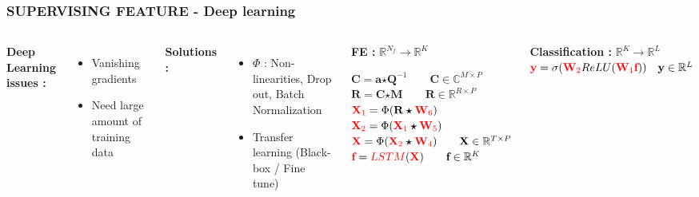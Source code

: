 \documentclass{beamer}
\begin{document}
\begin{frame}
\frametitle{SUPERVISING FEATURE - Deep learning}
\begin{columns}[c]
\textbf{Deep Learning issues :}
\begin{itemize}
\item Vanishing gradients
\item Need large amount of training data
\end{itemize}
\textbf{Solutions :}
\begin{itemize}
\item $\Phi$  : Non-linearities, Drop out, Batch Normalization
\item Transfer learning (Black-box / Fine tune)
\end{itemize}
\begin{block}{\textbf{FE :} $\mathbb{R}^{N_{f}} \rightarrow \mathbb{R}^{K}$}

$\textbf{C} = \textbf{a} \bm{\star} \textbf{Q}^{-1} \qquad \textbf{C} \in \mathbb{C}^{M \times P}$\\
$\textbf{R} = \textbf{C} \bm{\star} \textbf{M} \qquad \textbf{R} \in \mathbb{R}^{R \times P}$\\
${\color{red}\textbf{X}_{1}} = \Phi (\textbf{R} \bm{\star} {\color{red}\textbf{W}_{6}})$\\
${\color{red}\textbf{X}_{2}} = \Phi ({\color{red}\textbf{X}_{1}} \bm{\star} {\color{red}\textbf{W}_{5}})$\\
${\color{red}\textbf{X}} = \Phi ({\color{red}\textbf{X}_{2}} \bm{\star} {\color{red}\textbf{W}_{4}}) \qquad \textbf{X} \in \mathbb{R}^{T \times P}$\\
${\color{red}\textbf{f}} = {\color{red}LSTM}({\color{red}\textbf{X}}) \qquad \textbf{f} \in \mathbb{R}^{K}$\\
\end{block}

\begin{block}{\textbf{Classification :} $\mathbb{R}^{K} \rightarrow \mathbb{R}^{L}$}
${\color{red}\textbf{y}} = \sigma({\color{red}\textbf{W}_{2}}ReLU({\color{red}\textbf{W}_{1}}{\color{red}\textbf{f}})) \quad \textbf{y} \in \mathbb{R}^{L}$
\end{block}
\end{columns}
\end{frame}
\end{document}
